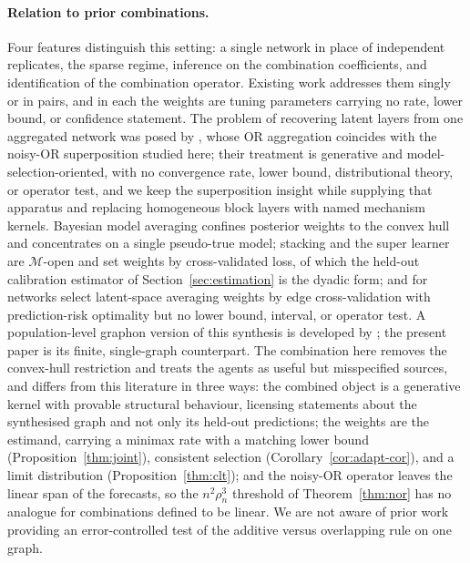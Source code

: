 \documentclass[12pt]{article}
\newcommand{\1}{\mathbf{1}}
\begin{document}
\paragraph{Relation to prior combinations.} Four features distinguish this setting: a single network in place of independent replicates, the sparse regime, inference on the combination coefficients, and identification of the combination operator. Existing work addresses them singly or in pairs, and in each the weights are tuning parameters carrying no rate, lower bound, or confidence statement. The problem of recovering latent layers from one aggregated network was posed by \citet{valles2016multilayer}, whose OR aggregation coincides with the noisy-OR superposition studied here; their treatment is generative and model-selection-oriented, with no convergence rate, lower bound, distributional theory, or operator test, and we keep the superposition insight while supplying that apparatus and replacing homogeneous block layers with named mechanism kernels. Bayesian model averaging \citep{hoeting1999bayesian,yao2018using} confines posterior weights to the convex hull and concentrates on a single pseudo-true model; stacking and the super learner \citep{wolpert1992stacked,breiman1996stacked,ghasemian2020stacking} are $\mathcal M$-open and set weights by cross-validated loss, of which the held-out calibration estimator of Section~\ref{sec:estimation} is the dyadic form; and for networks \citet{zhang2025network} select latent-space averaging weights by edge cross-validation with prediction-risk optimality but no lower bound, interval, or operator test. A population-level graphon version of this synthesis is developed by \citet{papamichalis2025graphon}; the present paper is its finite, single-graph counterpart. The combination here removes the convex-hull restriction and treats the agents as useful but misspecified sources, and differs from this literature in three ways: the combined object is a generative kernel with provable structural behaviour, licensing statements about the synthesised graph and not only its held-out predictions; the weights are the estimand, carrying a minimax rate with a matching lower bound (Proposition~\ref{thm:joint}), consistent selection (Corollary~\ref{cor:adapt-cor}), and a limit distribution (Proposition~\ref{thm:clt}); and the noisy-OR operator leaves the linear span of the forecasts, so the $n^2\rho_n^3$ threshold of Theorem~\ref{thm:nor} has no analogue for combinations defined to be linear. We are not aware of prior work providing an error-controlled test of the additive versus overlapping rule on one graph.
\end{document}
